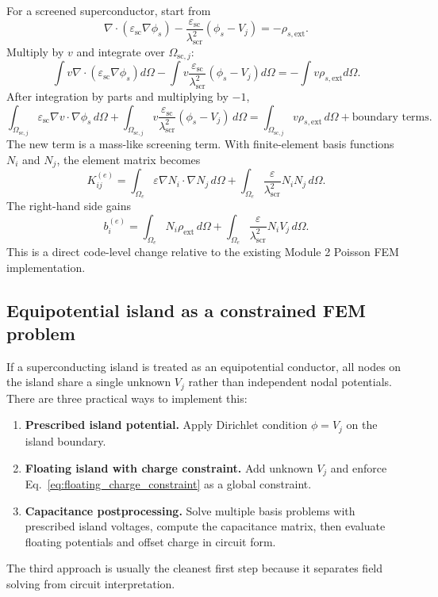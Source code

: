 \documentclass[11pt]{article}
\newcommand{\epssc}{\varepsilon_{\mathrm{sc}}}
\newcommand{\lams}{\lambda_{\mathrm{scr}}}
\begin{document}
For a screened superconductor, start from
\begin{equation}
\nabla\cdot(\epssc\nabla\phi_s)-\frac{\epssc}{\lams^2}(\phi_s-V_j)=-\rho_{s,\mathrm{ext}}.
\end{equation}
Multiply by $v$ and integrate over $\Omega_{\mathrm{sc},j}$:
\begin{equation}
\int v\nabla\cdot(\epssc\nabla\phi_s)d\Omega
-\int v\frac{\epssc}{\lams^2}(\phi_s-V_j)d\Omega
= -\int v\rho_{s,\mathrm{ext}}d\Omega.
\end{equation}
After integration by parts and multiplying by $-1$,
\begin{equation}
\boxed{
\int_{\Omega_{\mathrm{sc},j}}\epssc\nabla v\cdot\nabla\phi_s\,d\Omega
+\int_{\Omega_{\mathrm{sc},j}}v\frac{\epssc}{\lams^2}(\phi_s-V_j)\,d\Omega
=\int_{\Omega_{\mathrm{sc},j}}v\rho_{s,\mathrm{ext}}\,d\Omega
+\text{boundary terms}.}
\label{eq:screened_weak_form}
\end{equation}
The new term is a mass-like screening term. With finite-element basis functions $N_i$ and $N_j$, the element matrix becomes
\begin{equation}
K_{ij}^{(e)}
=\int_{\Omega_e}\varepsilon\nabla N_i\cdot\nabla N_j\,d\Omega
+\int_{\Omega_e}\frac{\varepsilon}{\lams^2}N_iN_j\,d\Omega.
\label{eq:screened_fem_matrix}
\end{equation}
The right-hand side gains
\begin{equation}
b_i^{(e)}=\int_{\Omega_e}N_i\rho_{\mathrm{ext}}\,d\Omega
+\int_{\Omega_e}\frac{\varepsilon}{\lams^2}N_iV_j\,d\Omega.
\label{eq:screened_fem_rhs}
\end{equation}
This is a direct code-level change relative to the existing Module 2 Poisson FEM implementation.

\subsection{Equipotential island as a constrained FEM problem}

If a superconducting island is treated as an equipotential conductor, all nodes on the island share a single unknown $V_j$ rather than independent nodal potentials. There are three practical ways to implement this:
\begin{enumerate}[leftmargin=2em]
\item \textbf{Prescribed island potential.} Apply Dirichlet condition $\phi=V_j$ on the island boundary.
\item \textbf{Floating island with charge constraint.} Add unknown $V_j$ and enforce Eq.~\eqref{eq:floating_charge_constraint} as a global constraint.
\item \textbf{Capacitance postprocessing.} Solve multiple basis problems with prescribed island voltages, compute the capacitance matrix, then evaluate floating potentials and offset charge in circuit form.
\end{enumerate}
The third approach is usually the cleanest first step because it separates field solving from circuit interpretation.
\end{document}

